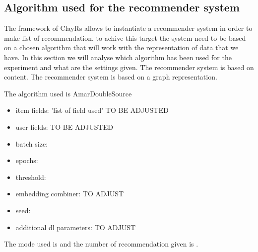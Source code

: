 \documentclass[11pt]{article}
\begin{document}
\hfill\break
\hfill\break


\subsection{Algorithm used for the recommender system}\label{subsec:algo}
The framework of ClayRs allows to instantiate a recommender system in order to make list of recommendation, to achive
this target the system need to be based on a chosen algorithm that will work with the representation of data that
we have.
In this section we will analyse which algorithm has been used for the experiment and what are the settings
given.
\hfill\break
\hfill\break
{}
The recommender system is based on content.
\hfill\break
\hfill\break
{}
The recommender system is based on a graph representation.
\hfill\break
\hfill\break


The algorithm used is AmarDoubleSource
\begin{itemize}
    \item item fields: 'list of field used' TO BE ADJUSTED
    \item user fields: TO BE ADJUSTED
    \item batch size: 
    \item epochs: 
    \item threshold: 
    \item embedding combiner: TO ADJUST
    \item seed: 
    \item additional dl parameters: TO ADJUST
\end{itemize}
\hfill\break
\hfill\break
The mode used is  and the number of recommendation given is
.
\hfill\break
\hfill\break
\end{document}
